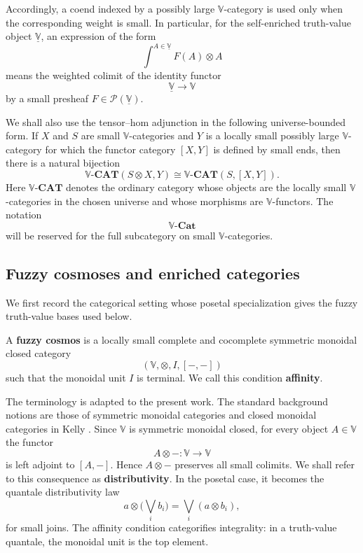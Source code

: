 Accordingly, a coend indexed by a possibly large \(\mathbb V\)-category is used only when the corresponding weight is small. In particular, for the self-enriched truth-value object \(\underline{\mathbb V}\), an expression of the form
\[
    \int^{A\in \underline{\mathbb V}} F(A)\otimes A
\]
means the weighted colimit of the identity functor
\[
    \underline{\mathbb V}\longrightarrow \mathbb V
\]
by a small presheaf \(F\in\mathcal P(\underline{\mathbb V})\).

We shall also use the tensor--hom adjunction in the following universe-bounded form. If \(X\) and \(S\) are small \(\mathbb V\)-categories and \(Y\) is a locally small possibly large \(\mathbb V\)-category for which the functor category \([X,Y]\) is defined by small ends, then there is a natural bijection
\[
    \mathbb V\text{-}\mathbf{CAT}(S\otimes X,Y)
    \cong
    \mathbb V\text{-}\mathbf{CAT}(S,[X,Y]).
\]
Here \(\mathbb V\text{-}\mathbf{CAT}\) denotes the ordinary category whose objects are the locally small \(\mathbb V\)-categories in the chosen universe and whose morphisms are \(\mathbb V\)-functors. The notation
\[
    \mathbb V\text{-}\mathbf{Cat}
\]
will be reserved for the full subcategory on small \(\mathbb V\)-categories.

\subsection{Fuzzy cosmoses and enriched categories}
\label{subsec:fuzzy-cosmoses-and-enriched-categories}

We first record the categorical setting whose posetal specialization gives the fuzzy truth-value bases used below.

\begin{definition}\label{def:fuzzy-cosmos}
    A \textbf{fuzzy cosmos} is a locally small complete and cocomplete symmetric monoidal closed category
    \[
        (\mathbb V,\otimes,I,[-,-])
    \]
    such that the monoidal unit \(I\) is terminal. We call this condition \textbf{affinity}.
\end{definition}

The terminology is adapted to the present work. The standard background notions are those of symmetric monoidal categories and closed monoidal categories in Kelly \cite[Sections~1.1, 1.4, and~1.5]{Kelly1982BasicConcepts}. Since \(\mathbb V\) is symmetric monoidal closed, for every object \(A\in\mathbb V\) the functor
\[
    A\otimes -:\mathbb V\to\mathbb V
\]
is left adjoint to \([A,-]\). Hence \(A\otimes-\) preserves all small colimits. We shall refer to this consequence as \textbf{distributivity}. In the posetal case, it becomes the quantale distributivity law
\[
    a\otimes\Big(\bigvee_i b_i\Big)
    =
    \bigvee_i(a\otimes b_i),
\]
for small joins. The affinity condition categorifies integrality: in a truth-value quantale, the monoidal unit is the top element.

